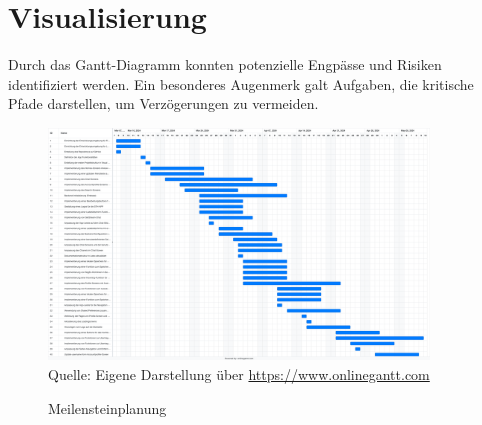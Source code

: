 \section{Visualisierung}
Durch das Gantt-Diagramm konnten potenzielle Engpässe und Risiken identifiziert werden.
Ein besonderes Augenmerk galt Aufgaben, die kritische Pfade darstellen, um Verzögerungen zu vermeiden.

\begin{figure}[H]
    \caption[Meilensteinplanung]{Meilensteinplanung}
    \includegraphics[width=0.9\textwidth]{assets/figures/STH GANTT Diagramm.png}
    \\
    Quelle: Eigene Darstellung über \url{https://www.onlinegantt.com}
\end{figure}
